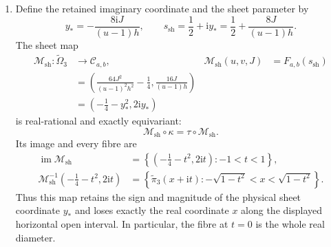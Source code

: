 \begin{theorem}
\begin{enumerate}
\item Define the retained imaginary coordinate and the sheet parameter by
\begin{equation}
 y_*=-\frac{8\mathrm iJ}{(u-1)h},
 \qquad
 s_{\mathrm{sh}}=\frac12+\mathrm i y_*
 =\frac12+\frac{8J}{(u-1)h}.
 \label{eq:n3-equivariant-sheet-parameter}
\end{equation}
The sheet map
\begin{align}
 \mathcal M_{\mathrm{sh}}:
 \widetilde\Omega_3&\longrightarrow\mathcal C_{a,b},
 &\mathcal M_{\mathrm{sh}}(u,v,J)
 &=F_{a,b}(s_{\mathrm{sh}})\nonumber\\
 &=\left(
 \frac{64J^2}{(u-1)^2h^2}-\frac14,
 \frac{16J}{(u-1)h}
 \right)\nonumber\\
 &=\left(-\frac14-y_*^2,2\mathrm i y_*\right)
 \label{eq:n3-equivariant-sheet-map}
\end{align}
is real-rational and exactly equivariant:
\begin{equation}
 \mathcal M_{\mathrm{sh}}\circ\kappa
 =\tau\circ\mathcal M_{\mathrm{sh}}.
 \label{eq:n3-sheet-map-equivariance}
\end{equation}
Its image and every fibre are
\begin{align}
 \operatorname{im}\mathcal M_{\mathrm{sh}}
 &=\left\{\left(-\frac14-t^2,2\mathrm i t\right):-1<t<1\right\},
 \label{eq:n3-sheet-map-image}\\
 \mathcal M_{\mathrm{sh}}^{-1}
 \left(-\frac14-t^2,2\mathrm i t\right)
 &=\left\{\widetilde\pi_3(x+\mathrm i t):
 -\sqrt{1-t^2}<x<\sqrt{1-t^2}\right\}.
 \label{eq:n3-sheet-map-fibres}
\end{align}
Thus this map retains the sign and magnitude of the physical sheet coordinate
$y_*$ and loses exactly the real coordinate $x$ along the displayed horizontal
open interval.  In particular, the fibre at $t=0$ is the whole real diameter.


\end{enumerate}
\end{theorem}

